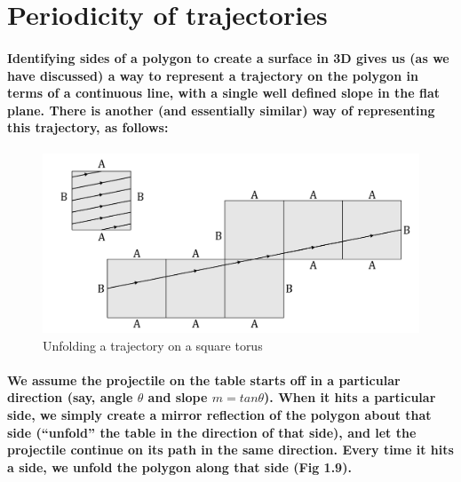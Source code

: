 \documentclass{report}
\begin{document}
\section{Periodicity of trajectories}

\paragraph{Identifying sides of a polygon to create a surface in 3D gives us (as we have discussed) a way to represent a trajectory on the polygon in terms of a continuous line, with a single well defined slope in the flat plane. There is another (and essentially similar) way of representing this trajectory, as follows:}

\begin{figure} 
\begin{center}
\includegraphics[scale=0.3]{9}
\caption{Unfolding a trajectory on a square torus}
\end{center}
\end{figure}

\paragraph{We assume the projectile on the table starts off in a particular direction (say, angle $\theta$ and slope $m = tan\theta$). When it hits a particular side, we simply create a mirror reflection of the polygon about that side (“unfold” the table in the direction of that side), and let the projectile continue on its path in the same direction. Every time it hits a side, we unfold the polygon along that side (Fig 1.9).\\ \\ \\ \\ \\}

\pagebreak
\end{document}
